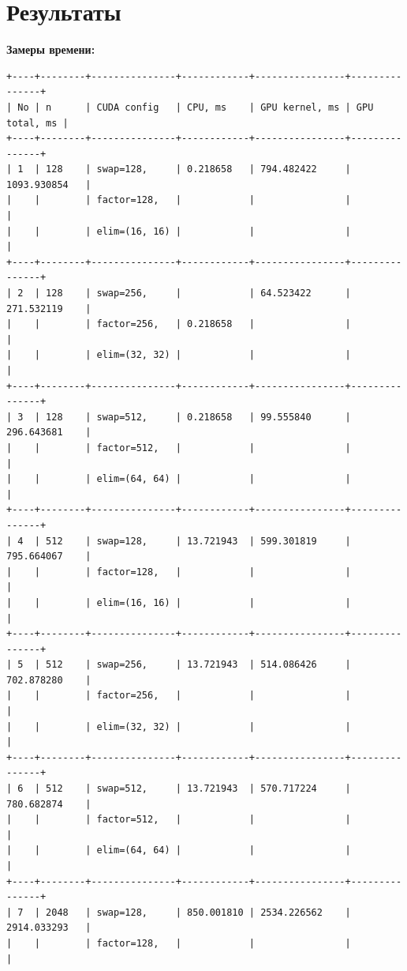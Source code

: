 \documentclass[a4paper,14pt]{extarticle}
\begin{document}
\section*{Результаты}
\textbf{Замеры времени:}

\begin{lstlisting}[basicstyle=\ttfamily\scriptsize,frame=single]
+----+--------+---------------+------------+----------------+---------------+
| No | n      | CUDA config   | CPU, ms    | GPU kernel, ms | GPU total, ms |
+----+--------+---------------+------------+----------------+---------------+
| 1  | 128    | swap=128,     | 0.218658   | 794.482422     | 1093.930854   |
|    |        | factor=128,   |            |                |               |
|    |        | elim=(16, 16) |            |                |               |
+----+--------+---------------+------------+----------------+---------------+
| 2  | 128    | swap=256,     |            | 64.523422      | 271.532119    |
|    |        | factor=256,   | 0.218658   |                |               |
|    |        | elim=(32, 32) |            |                |               |
+----+--------+---------------+------------+----------------+---------------+
| 3  | 128    | swap=512,     | 0.218658   | 99.555840      | 296.643681    |
|    |        | factor=512,   |            |                |               |
|    |        | elim=(64, 64) |            |                |               |
+----+--------+---------------+------------+----------------+---------------+
| 4  | 512    | swap=128,     | 13.721943  | 599.301819     | 795.664067    |
|    |        | factor=128,   |            |                |               |
|    |        | elim=(16, 16) |            |                |               |
+----+--------+---------------+------------+----------------+---------------+
| 5  | 512    | swap=256,     | 13.721943  | 514.086426     | 702.878280    |
|    |        | factor=256,   |            |                |               |
|    |        | elim=(32, 32) |            |                |               |
+----+--------+---------------+------------+----------------+---------------+
| 6  | 512    | swap=512,     | 13.721943  | 570.717224     | 780.682874    |
|    |        | factor=512,   |            |                |               |
|    |        | elim=(64, 64) |            |                |               |
+----+--------+---------------+------------+----------------+---------------+
| 7  | 2048   | swap=128,     | 850.001810 | 2534.226562    | 2914.033293   |
|    |        | factor=128,   |            |                |               |

\end{lstlisting}
\end{document}
